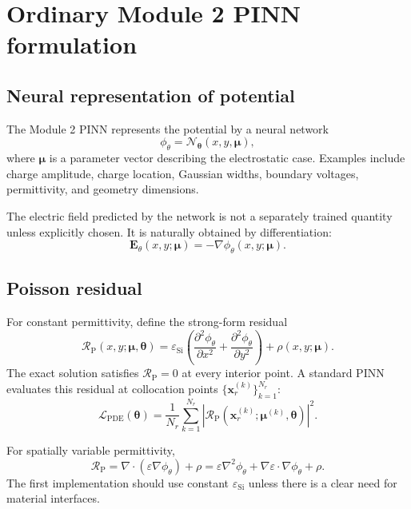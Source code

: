\documentclass[11pt]{article}
\newcommand{\thetav}{\bm{\theta}}
\newcommand{\xv}{\bm{x}}
\newcommand{\muv}{\bm{\mu}}
\newcommand{\Evec}{\mathbf{E}}
\newcommand{\epss}{\varepsilon_{\mathrm{Si}}}
\newcommand{\phinn}{\phi_{\theta}}
\newcommand{\Rpoisson}{\mathcal{R}_{\mathrm{P}}}
\newcommand{\Lpde}{\mathcal{L}_{\mathrm{PDE}}}
\begin{document}
\section{Ordinary Module 2 PINN formulation}

\subsection{Neural representation of potential}

The Module 2 PINN represents the potential by a neural network
\begin{equation}
\phinn=\mathcal{N}_{\thetav}(x,y,\muv),
\label{eq:ordinary_pinn_representation}
\end{equation}
where $\muv$ is a parameter vector describing the electrostatic case. Examples include charge amplitude, charge location, Gaussian widths, boundary voltages, permittivity, and geometry dimensions.

The electric field predicted by the network is not a separately trained quantity unless explicitly chosen. It is naturally obtained by differentiation:
\begin{equation}
\Evec_{\theta}(x,y;\muv)=-\nabla\phinn(x,y;\muv).
\label{eq:network_field}
\end{equation}

\subsection{Poisson residual}

For constant permittivity, define the strong-form residual
\begin{equation}
\Rpoisson(x,y;\muv,\thetav)
=\epss\left(\frac{\partial^2\phinn}{\partial x^2}+\frac{\partial^2\phinn}{\partial y^2}\right)+\rho(x,y;\muv).
\label{eq:dimensional_poisson_residual}
\end{equation}
The exact solution satisfies $\Rpoisson=0$ at every interior point. A standard PINN evaluates this residual at collocation points $\{\xv_r^{(k)}\}_{k=1}^{N_r}$:
\begin{equation}
\Lpde(\thetav)=\frac{1}{N_r}\sum_{k=1}^{N_r}\left|\Rpoisson\left(\xv_r^{(k)};\muv^{(k)},\thetav\right)\right|^2.
\label{eq:ordinary_pde_loss}
\end{equation}

For spatially variable permittivity,
\begin{equation}
\Rpoisson=\nabla\cdot\left(\varepsilon\nabla\phinn\right)+\rho
=\varepsilon\nabla^2\phinn+\nabla\varepsilon\cdot\nabla\phinn+\rho.
\label{eq:variable_eps_residual}
\end{equation}
The first implementation should use constant $\epss$ unless there is a clear need for material interfaces.
\end{document}
